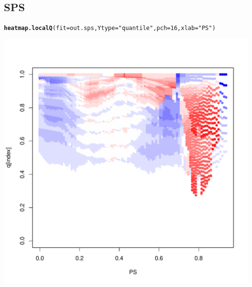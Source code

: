 \documentclass{article}\usepackage[]{graphicx}\usepackage[]{color}
\makeatletter
\def\maxwidth{ %
  \ifdim\Gin@nat@width>\linewidth
    \linewidth
  \else
    \Gin@nat@width
  \fi
}
\newcommand{\hlnum}[1]{\textcolor[rgb]{0.686,0.059,0.569}{#1}}%
\newcommand{\hlstr}[1]{\textcolor[rgb]{0.192,0.494,0.8}{#1}}%
\newcommand{\hlstd}[1]{\textcolor[rgb]{0.345,0.345,0.345}{#1}}%
\newcommand{\hlkwc}[1]{\textcolor[rgb]{0.333,0.667,0.333}{#1}}%
\newcommand{\hlkwd}[1]{\textcolor[rgb]{0.737,0.353,0.396}{\textbf{#1}}}%
\newenvironment{kframe}{%
 \def\at@end@of@kframe{}%
 \ifinner\ifhmode%
  \def\at@end@of@kframe{\end{minipage}}%
  \begin{minipage}{\columnwidth}%
 \fi\fi%
 \def\FrameCommand##1{\hskip\@totalleftmargin \hskip-\fboxsep
 \colorbox{shadecolor}{##1}\hskip-\fboxsep
     \hskip-\linewidth \hskip-\@totalleftmargin \hskip\columnwidth}%
 \MakeFramed {\advance\hsize-\width
   \@totalleftmargin\z@ \linewidth\hsize
   \@setminipage}}%
 {\par\unskip\endMakeFramed%
 \at@end@of@kframe}
\newenvironment{knitrout}{}{} %
\makeatother
\begin{document}
\subsection{SPS}
\begin{knitrout}
\color{fgcolor}\begin{kframe}
\begin{alltt}
\hlkwd{heatmap.localQ}\hlstd{(}\hlkwc{fit}\hlstd{=out.sps ,} \hlkwc{Ytype}\hlstd{=}\hlstr{"quantile"} \hlstd{,} \hlkwc{pch}\hlstd{=}\hlnum{16} \hlstd{,} \hlkwc{xlab}\hlstd{=}\hlstr{"PS"}\hlstd{)}
\end{alltt}
\end{kframe}

{\centering \includegraphics[width=\maxwidth]{figures/SPS-heatmap-1} 

}



\end{knitrout}
\end{document}
